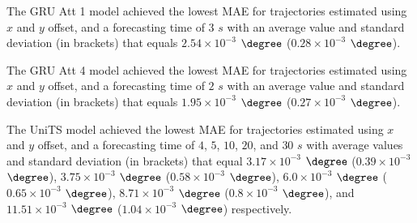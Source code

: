 \begin{table}[!ht]
	\centering
	\caption{The average MAE in $\degree$ ($\times 10^{-3}$), with standard deviation in brackets, across $k$-fold validation datasets for the trajectories in the $k$-fold testing datasets estimated using $x$ and $y$ offset, different RNN models, and forecasting times.}
	\label{tab:best_no_abs_MAE}
\end{table}

The GRU Att 1 model achieved the lowest MAE for trajectories estimated using $x$ and $y$ offset, and a forecasting time of $3$ $s$ with an average value and standard deviation (in brackets) that equals $2.54 \times 10^{-3}$ $\degree$ ($0.28 \times 10^{-3}$ $\degree$).

The GRU Att 4 model achieved the lowest MAE for trajectories estimated using $x$ and $y$ offset, and a forecasting time of $2$ $s$ with an average value and standard deviation (in brackets) that equals $1.95 \times 10^{-3}$ $\degree$ ($0.27 \times 10^{-3}$ $\degree$).

The UniTS model achieved the lowest MAE for trajectories estimated using $x$ and $y$ offset, and a forecasting time of $4$, $5$, $10$, $20$, and $30$ $s$ with average values and standard deviation (in brackets) that equal $3.17 \times 10^{-3}$ $\degree$ ($0.39 \times 10^{-3}$ $\degree$), $3.75 \times 10^{-3}$ $\degree$ ($0.58 \times 10^{-3}$ $\degree$), $6.0 \times 10^{-3}$ $\degree$ ($0.65 \times 10^{-3}$ $\degree$), $8.71 \times 10^{-3}$ $\degree$ ($0.8 \times 10^{-3}$ $\degree$), and $11.51 \times 10^{-3}$ $\degree$ ($1.04 \times 10^{-3}$ $\degree$) respectively.

